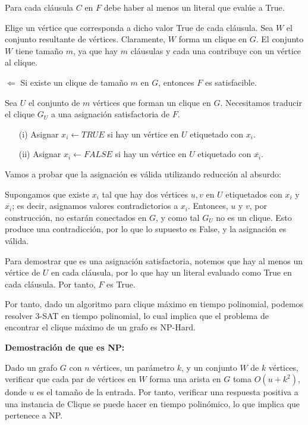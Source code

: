 \documentclass[9pt]{article}
\begin{document}
    Para cada cláusula \( C \) en \( F \) debe haber al menos un literal que evalúe a True.
    
    Elige un vértice que corresponda a dicho valor True de cada cláusula. Sea \( W \) el conjunto resultante de vértices. Claramente, \( W \) forma un clique en \( G \). El conjunto \( W \) tiene tamaño \( m \), ya que hay \( m \) cláusulas y cada una contribuye con un vértice al clique.
    
    \textbf{$\Leftarrow$} Si existe un clique de tamaño $m$ en $G$, entonces $F$ es satisfacible.
    
    Sea \( U \) el conjunto de \( m \) vértices que forman un clique en \( G \). Necesitamos traducir el clique \( G_U \) a una asignación satisfactoria de \( F \).
    
    \begin{itemize}
        \item[(i)] Asignar \( x_i \leftarrow TRUE \) si hay un vértice en \( U \) etiquetado con \( x_i \).
        \item[(ii)] Asignar \( x_i \leftarrow FALSE \) si hay un vértice en \( U \) etiquetado con \( \overline{x_i} \).
    \end{itemize}
    
    Vamos a probar que la asignación es válida utilizando reducción al absurdo:
    
    Supongamos que existe \( x_i \) tal que hay dos vértices \( u, v \) en \( U \) etiquetados con \( x_i \) y \( \overline{x_i} \); es decir, asignamos valores contradictorios a \( x_i \). Entonces, \( u \) y \( v \), por construcción, no estarán conectados en \( G \), y como tal \( G_U \) no es un clique. Esto produce una contradicción, por lo que lo supuesto es False, y la asignación es válida.
    
    Para demostrar que es una asignación satisfactoria, notemos que hay al menos un vértice de \( U \) en cada cláusula, por lo que hay un literal evaluado como True en cada cláusula. Por tanto, \( F \) es True.
    
    Por tanto, dado un algoritmo para clique máximo en tiempo polinomial, podemos resolver 3-SAT en tiempo polinomial, lo cual implica que el problema de encontrar el clique máximo de un grafo es NP-Hard.
    
    \textbf{Demostración de que es NP:}
    
    Dado un grafo \( G \) con \( n \) vértices, un parámetro \( k \), y un conjunto \( W \) de \( k \) vértices, verificar que cada par de vértices en \( W \) forma una arista en \( G \) toma \( O(u + k^2) \), donde \( u \) es el tamaño de la entrada. Por tanto, verificar una respuesta positiva a una instancia de Clique se puede hacer en tiempo polinómico, lo que implica que pertenece a NP.
    
\end{document}
